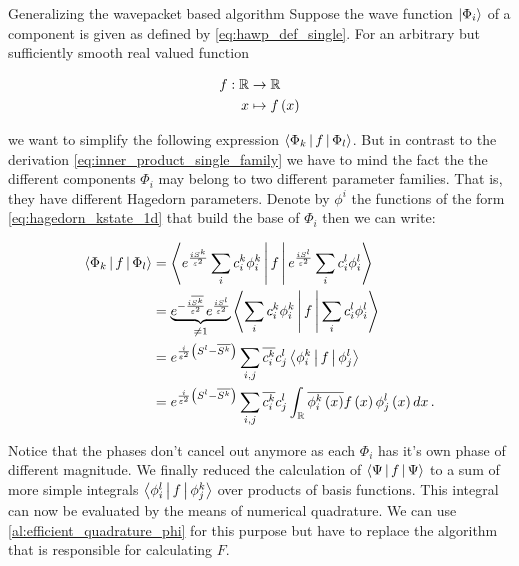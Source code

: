 \begin{chapter}{Generalizing the wavepacket based algorithm}
Suppose the wave function $\Ket{\Phi_i}$ of a component is given as defined by
\eqref{eq:hawp_def_single}. For an arbitrary but sufficiently smooth real valued
function

\begin{align*}
  f : \mathbb{R} & \rightarrow \mathbb{R} \\
               x & \mapsto f \left( x \right)
\end{align*}

we want to simplify the following expression $\Braket{ \Phi_k | f | \Phi_l }$.
But in contrast to the derivation \eqref{eq:inner_product_single_family} we have
to mind the fact the the different components $\Phi_i$ may belong to two different
parameter families. That is, they have different Hagedorn parameters. Denote by
$\phi^i$ the functions of the form \eqref{eq:hagedorn_kstate_1d} that build the
base of $\Phi_i$ then we can write:

\begin{equation} \label{eq:inner_product_multi_families}
\begin{split}
  \Braket{ \Phi_k | f | \Phi_l } & = \Braket{e^{\frac{iS^k}{\varepsilon^2}} \sum_i c^k_i \phi^k_i |
                                     f | e^{\frac{iS^l}{\varepsilon^2}} \sum_i c^l_i \phi^l_i} \nonumber \\
                                 & = \underbrace{e^{-\frac{i\overline{S^k}}{\varepsilon^2}} e^{\frac{iS^l}{\varepsilon^2}}}_{\neq 1}
                                     \Braket{\sum_i c^k_i \phi^k_i | f | \sum_i c^l_i \phi^l_i} \nonumber \\
                                 & = e^{\frac{i}{\varepsilon^2}\left(S^l-\overline{S^k}\right)}
                                     \sum_{i,j} \overline{c^k_i} c^l_j \Braket{\phi^k_i | f | \phi^l_j} \nonumber \\
                                 & = e^{\frac{i}{\varepsilon^2}\left(S^l-\overline{S^k}\right)}
                                     \sum_{i,j} \overline{c^k_i} c^l_j \int_\mathbb{R} \overline{\phi^k_i\left( x \right)} f\left( x \right) \phi^l_j\left( x \right) dx \,.
\end{split}
\end{equation}

Notice that the phases don't cancel out anymore as each $\Phi_i$ has it's own phase
of different magnitude. We finally reduced the calculation of $\Braket{\Psi | f | \Psi}$ to
a sum of more simple integrals $\Braket{\phi^l_i | f | \phi^k_j}$ over products
of basis functions. This integral can now be evaluated by the means of numerical
quadrature. We can use \ref{al:efficient_quadrature_phi} for this purpose but have
to replace the algorithm that is responsible for calculating $F$.


\end{chapter}
